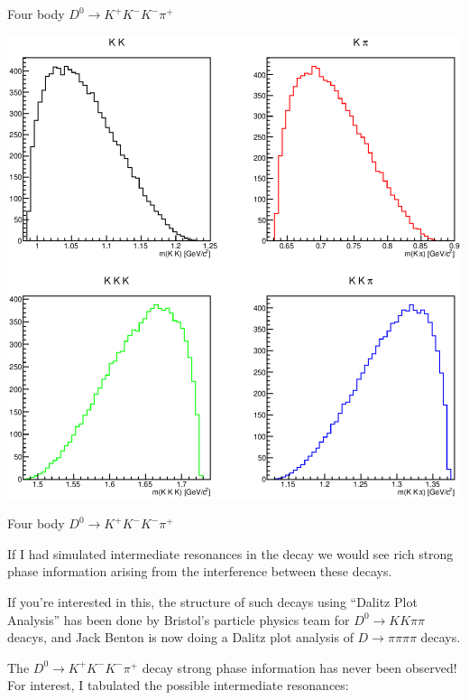 \begin{frame}{Four body $D^0 \rightarrow K^+ K^- K^- \pi^+$}

\begin{center}
    \includegraphics[scale=0.3]{graphs/FourBodyDecay.eps}
\end{center}
\end{frame}

\begin{frame}{Four body $D^0 \rightarrow K^+ K^- K^- \pi^+$}
\begin{itemize}

    \Item If I had simulated intermediate resonances in the decay we would see
        rich strong phase information arising from the interference between
        these decays.
    
    \Item If you're interested in this, the structure of such decays using
        ``Dalitz Plot Analysis'' has been done by Bristol's particle physics
        team for $D^0 \rightarrow K K \pi \pi$ deacys, and Jack Benton is now
        doing a Dalitz plot analysis of $D \rightarrow \pi \pi \pi \pi$ decays.
    
    \Item The $D^0 \rightarrow K^+ K^- K^- \pi^+$ decay strong phase information
        has never been observed! For interest, I tabulated the possible
        intermediate resonances:

\end{itemize}
\end{frame}

\begin{frame}
\tiny
{\centering

}
\end{frame}

\begin{frame}
\tiny
{\centering

}
\end{frame}

\begin{frame}
\tiny
{\centering

}
\end{frame}
